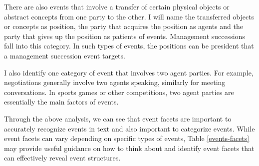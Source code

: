There are also events that involve a transfer of 
certain physical objects or abstract concepts 
from one party to the other. I will name the 
transferred objects or concepts as position, the 
party that acquires the position as agents and the party that gives up the position as 
patients of events. 
Management successions 
fall into this category. 
In 
such types of events, 
the positions can be 
president
that 
a management succession event targets. 

I also identify one category of event that involves two agent parties. 
For example, negotiations generally involve two agents speaking,  
similarly for meeting conversations. In sports games or other competitions, 
two agent parties are essentially the main factors of events. 



Through the above analysis, we can see that event facets are 
important to accurately recognize events in text and also important to categorize events. 
While event facets can vary depending on specific types of events, 
Table \ref{events-facets} may provide useful guidance on how to 
think about and identify event facets that can effectively reveal event structures. 




